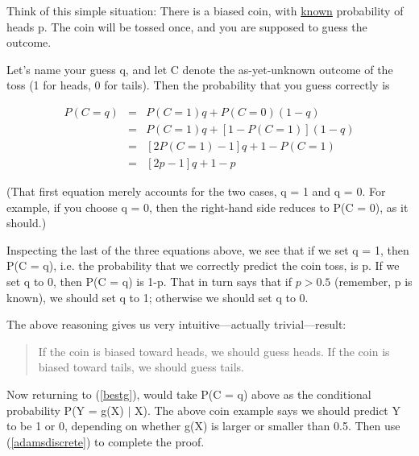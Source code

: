Think of this simple situation:  There is a biased coin, with
\underline{known} probability of heads p.  The coin will be tossed once,
and you are supposed to guess the outcome.  

Let's name your guess q, and let C denote the as-yet-unknown outcome of
the toss (1 for heads, 0 for tails).  Then the probability that you
guess correctly is

\begin{eqnarray}
P(C = q) &=& P(C = 1) q + P(C = 0) (1-q) \\ 
&=& P(C = 1) q + [1 - P(C = 1)] (1-q) \\ 
&=& [2 P(C = 1) - 1] q + 1 - P(C = 1) \\
&=& [2 p - 1] q + 1 - p 
\end{eqnarray}

(That first equation merely accounts for the two cases, q = 1 and q =
0.  For example, if you choose q = 0, then the right-hand side reduces
to P(C = 0), as it should.)

Inspecting the last of the three equations above, we see that if we set
q = 1, then P(C = q), i.e. the probability that we correctly predict the
coin toss, is p.  If we set q to 0, then P(C = q) is 1-p.  That in turn
says that if $p > 0.5$ (remember, p is known), we should set q to 1;
otherwise we should set q to 0.

The above reasoning gives us very intuitive---actually trivial---result:

\begin{quote}
If the coin is biased toward heads, we should guess heads.  If the coin
is biased toward tails, we should guess tails.
\end{quote}

Now returning to (\ref{bestg}), would take P(C = q) above as the
conditional probability P(Y = g(X) $|$ X).  The above coin example says
we should predict Y to be 1 or 0, depending on whether g(X) is larger or
smaller than 0.5.  Then use (\ref{adamsdiscrete}) to complete the proof.


